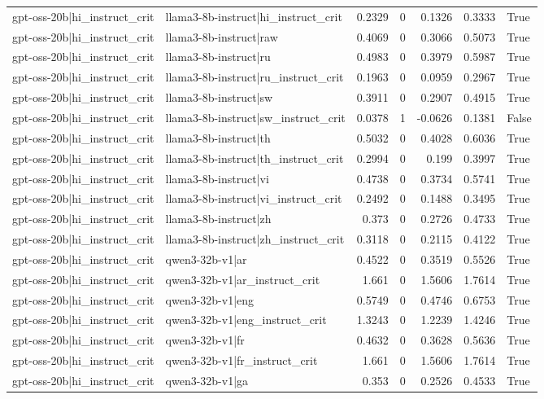 \begin{table}
\begin{tabular}{l l r r r r l}
gpt-oss-20b|hi_instruct_crit & llama3-8b-instruct|hi_instruct_crit & 0.2329 & 0 & 0.1326 & 0.3333 & True \\
gpt-oss-20b|hi_instruct_crit & llama3-8b-instruct|raw & 0.4069 & 0 & 0.3066 & 0.5073 & True \\
gpt-oss-20b|hi_instruct_crit & llama3-8b-instruct|ru & 0.4983 & 0 & 0.3979 & 0.5987 & True \\
gpt-oss-20b|hi_instruct_crit & llama3-8b-instruct|ru_instruct_crit & 0.1963 & 0 & 0.0959 & 0.2967 & True \\
gpt-oss-20b|hi_instruct_crit & llama3-8b-instruct|sw & 0.3911 & 0 & 0.2907 & 0.4915 & True \\
gpt-oss-20b|hi_instruct_crit & llama3-8b-instruct|sw_instruct_crit & 0.0378 & 1 & -0.0626 & 0.1381 & False \\
gpt-oss-20b|hi_instruct_crit & llama3-8b-instruct|th & 0.5032 & 0 & 0.4028 & 0.6036 & True \\
gpt-oss-20b|hi_instruct_crit & llama3-8b-instruct|th_instruct_crit & 0.2994 & 0 & 0.199 & 0.3997 & True \\
gpt-oss-20b|hi_instruct_crit & llama3-8b-instruct|vi & 0.4738 & 0 & 0.3734 & 0.5741 & True \\
gpt-oss-20b|hi_instruct_crit & llama3-8b-instruct|vi_instruct_crit & 0.2492 & 0 & 0.1488 & 0.3495 & True \\
gpt-oss-20b|hi_instruct_crit & llama3-8b-instruct|zh & 0.373 & 0 & 0.2726 & 0.4733 & True \\
gpt-oss-20b|hi_instruct_crit & llama3-8b-instruct|zh_instruct_crit & 0.3118 & 0 & 0.2115 & 0.4122 & True \\
gpt-oss-20b|hi_instruct_crit & qwen3-32b-v1|ar & 0.4522 & 0 & 0.3519 & 0.5526 & True \\
gpt-oss-20b|hi_instruct_crit & qwen3-32b-v1|ar_instruct_crit & 1.661 & 0 & 1.5606 & 1.7614 & True \\
gpt-oss-20b|hi_instruct_crit & qwen3-32b-v1|eng & 0.5749 & 0 & 0.4746 & 0.6753 & True \\
gpt-oss-20b|hi_instruct_crit & qwen3-32b-v1|eng_instruct_crit & 1.3243 & 0 & 1.2239 & 1.4246 & True \\
gpt-oss-20b|hi_instruct_crit & qwen3-32b-v1|fr & 0.4632 & 0 & 0.3628 & 0.5636 & True \\
gpt-oss-20b|hi_instruct_crit & qwen3-32b-v1|fr_instruct_crit & 1.661 & 0 & 1.5606 & 1.7614 & True \\
gpt-oss-20b|hi_instruct_crit & qwen3-32b-v1|ga & 0.353 & 0 & 0.2526 & 0.4533 & True \\

\end{tabular}
\end{table}
